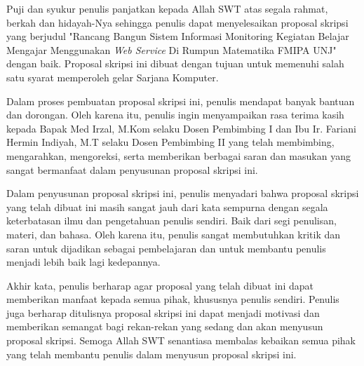 \documentclass{jtetiskripsi}
\begin{document}
\cover


%
%


\preface
\begin{onehalfspace}
Puji dan syukur penulis panjatkan kepada Allah SWT atas segala rahmat, berkah dan hidayah-Nya sehingga penulis dapat menyelesaikan proposal skripsi yang berjudul "Rancang Bangun Sistem Informasi Monitoring Kegiatan Belajar Mengajar Menggunakan \textit{Web Service} Di Rumpun Matematika FMIPA UNJ" dengan baik. Proposal skripsi ini dibuat dengan tujuan untuk memenuhi salah satu syarat memperoleh gelar Sarjana Komputer.  

Dalam proses pembuatan proposal skripsi ini, penulis mendapat banyak bantuan dan dorongan. Oleh karena itu, penulis ingin menyampaikan rasa terima kasih kepada Bapak Med Irzal, M.Kom selaku Dosen Pembimbing I dan Ibu Ir. Fariani Hermin Indiyah, M.T selaku Dosen Pembimbing II yang telah membimbing, mengarahkan, mengoreksi, serta memberikan berbagai saran dan masukan yang sangat bermanfaat dalam penyusunan proposal skripsi ini.

Dalam penyusunan proposal skripsi ini, penulis menyadari bahwa proposal skripsi yang telah dibuat ini masih sangat jauh dari kata sempurna dengan segala keterbatasan ilmu dan pengetahuan penulis sendiri. Baik dari segi penulisan, materi, dan bahasa. Oleh karena itu, penulis sangat membutuhkan kritik dan saran untuk dijadikan sebagai pembelajaran dan untuk membantu penulis menjadi lebih baik lagi kedepannya.

Akhir kata, penulis berharap agar proposal yang telah dibuat ini dapat memberikan manfaat kepada semua pihak, khususnya penulis sendiri. Penulis juga berharap ditulisnya proposal skripsi ini dapat menjadi motivasi dan memberikan semangat bagi rekan-rekan yang sedang dan akan menyusun proposal skripsi. Semoga Allah SWT senantiasa membalas kebaikan semua pihak yang telah membantu penulis dalam menyusun proposal skripsi ini.
\end{onehalfspace}
\vspace{.5cm}
\end{document}
